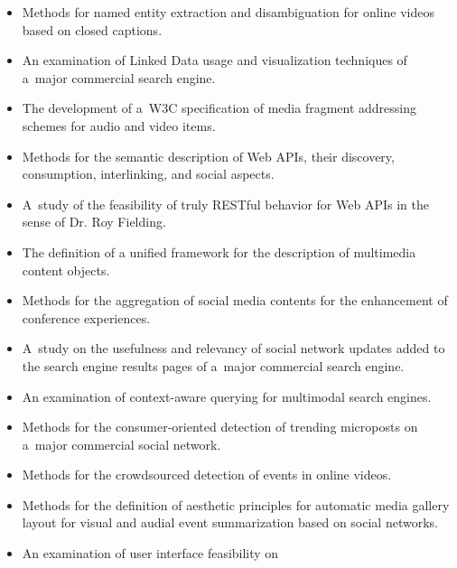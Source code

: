 \begin{itemize}
  \item Methods for named entity extraction and disambiguation
        for online videos based on closed captions.
  \item An examination of Linked Data usage and visualization
        techniques of a~major commercial search engine.
  \item The development of a~W3C specification of media
        fragment addressing schemes for audio and video items.
  \item Methods for the semantic description of Web APIs,
        their discovery, consumption, interlinking,
        and social aspects.
  \item A~study of the feasibility of truly RESTful behavior
        for Web APIs in the sense of Dr. Roy Fielding.
  \item The definition of a unified framework for the description
        of multimedia content objects.
  \item Methods for the aggregation of social media contents
        for the enhancement of conference experiences.
  \item A~study on the usefulness and relevancy of social network
        updates added to the search engine results pages of a~major
        commercial search engine.
  \item An examination of context-aware querying for multimodal
        search engines.
  \item Methods for the consumer-oriented detection of trending
        microposts on a~major commercial social network.
  \item Methods for the crowdsourced detection of events in
        online videos.
  \item Methods for the definition of aesthetic principles
        for automatic media gallery layout for visual
        and audial event summarization based on social networks.
  \item An examination of user interface feasibility on

\end{itemize}
